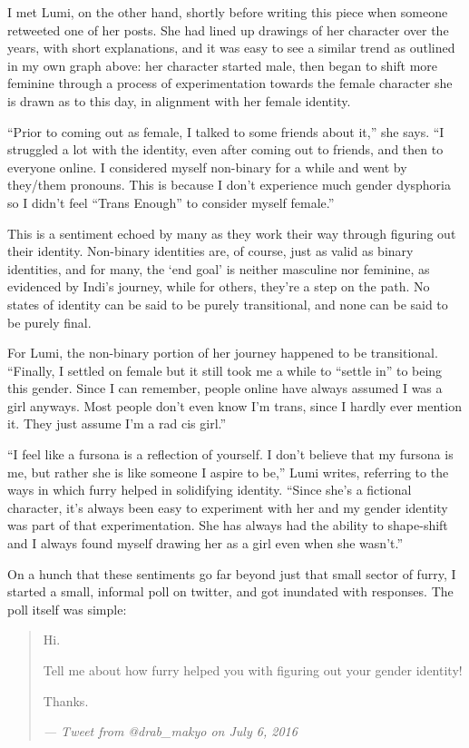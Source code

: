 I met Lumi, on the other hand, shortly before writing this piece when someone retweeted one of her posts. She had lined up drawings of her character over the years, with short explanations, and it was easy to see a similar trend as outlined in my own graph above: her character started male, then began to shift more feminine through a process of experimentation towards the female character she is drawn as to this day, in alignment with her female identity.

``Prior to coming out as female, I talked to some friends about it,'' she says. ``I struggled a lot with the identity, even after coming out to friends, and then to everyone online. I considered myself non-binary for a while and went by they/them pronouns. This is because I don't experience much gender dysphoria so I didn't feel ``Trans Enough'' to consider myself female.''

This is a sentiment echoed by many as they work their way through figuring out their identity. Non-binary identities are, of course, just as valid as binary identities, and for many, the `end goal' is neither masculine nor feminine, as evidenced by Indi's journey, while for others, they're a step on the path. No states of identity can be said to be purely transitional, and none can be said to be purely final.

For Lumi, the non-binary portion of her journey happened to be transitional. ``Finally, I settled on female but it still took me a while to ``settle in'' to being this gender. Since I can remember, people online have always assumed I was a girl anyways. Most people don't even know I'm trans, since I hardly ever mention it. They just assume I'm a rad cis girl.''

``I feel like a fursona is a reflection of yourself. I don't believe that my fursona is me, but rather she is like someone I aspire to be,'' Lumi writes, referring to the ways in which furry helped in solidifying identity. ``Since she's a fictional character, it's always been easy to experiment with her and my gender identity was part of that experimentation. She has always had the ability to shape-shift and I always found myself drawing her as a girl even when she wasn't.''

\secdiv

On a hunch that these sentiments go far beyond just that small sector of furry, I started a small, informal poll on twitter, and got inundated with responses. The poll itself was simple:

\begin{quotation}
  Hi.

  Tell me about how furry helped you with figuring out your gender identity!

  Thanks.

  \textit{--- Tweet from @drab\_makyo on July 6, 2016}
\end{quotation}

